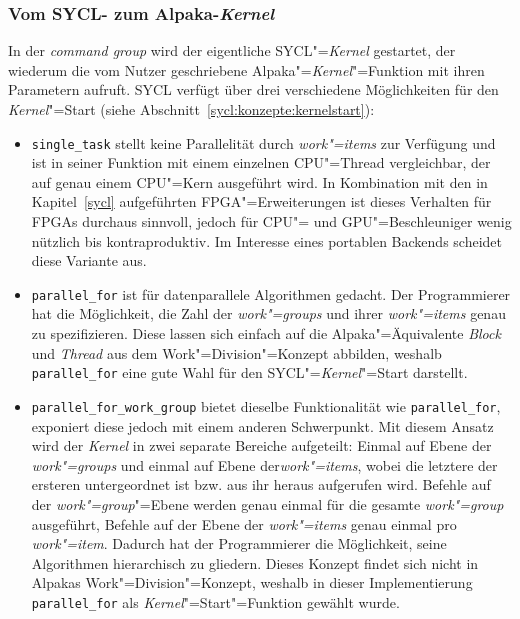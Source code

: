 \subsubsection{Vom SYCL- zum Alpaka-\textit{Kernel}}
\label{implementierung:task:kernel:launch}

In der \textit{command group} wird der eigentliche SYCL"=\textit{Kernel}
gestartet, der wiederum die vom Nutzer geschriebene
Alpaka"=\textit{Kernel}"=Funktion mit ihren Parametern aufruft. SYCL verfügt
über drei verschiedene Möglichkeiten für den \textit{Kernel}"=Start (siehe
Abschnitt~\ref{sycl:konzepte:kernelstart}):

\begin{itemize}
    \item \texttt{single\_task} stellt keine Parallelität durch
          \textit{work"=items} zur Verfügung und ist in seiner Funktion mit
          einem einzelnen CPU"=Thread vergleichbar, der auf genau einem
          CPU"=Kern ausgeführt wird. In Kombination mit den in
          Kapitel~\ref{sycl} aufgeführten FPGA"=Erweiterungen ist dieses
          Verhalten für FPGAs durchaus sinnvoll, jedoch für CPU"= und
          GPU"=Beschleuniger wenig nützlich bis kontraproduktiv. Im Interesse
          eines portablen Backends scheidet diese Variante aus.
    \item \texttt{parallel\_for} ist für datenparallele Algorithmen gedacht.
          Der Programmierer hat die Möglichkeit, die Zahl der
          \textit{work"=groups} und ihrer \textit{work"=items} genau zu
          spezifizieren. Diese lassen sich einfach auf die Alpaka"=Äquivalente
          \textit{Block} und \textit{Thread} aus dem Work"=Division"=Konzept
          abbilden, weshalb \texttt{parallel\_for} eine gute Wahl für den
          SYCL"=\textit{Kernel}"=Start darstellt.
    \item \texttt{parallel\_for\_work\_group} bietet dieselbe Funktionalität wie
          \texttt{parallel\_for}, exponiert diese jedoch mit einem anderen
          Schwerpunkt. Mit diesem Ansatz wird der \textit{Kernel} in zwei
          separate Bereiche aufgeteilt: Einmal auf Ebene der
          \textit{work"=groups} und einmal auf Ebene der\textit{work"=items},
          wobei die letztere der ersteren untergeordnet ist bzw. aus ihr heraus
          aufgerufen wird. Befehle auf der \textit{work"=group}"=Ebene werden
          genau einmal für die gesamte \textit{work"=group} ausgeführt, Befehle
          auf der Ebene der \textit{work"=items} genau einmal pro
          \textit{work"=item}. Dadurch hat der Programmierer die Möglichkeit,
          seine Algorithmen hierarchisch zu gliedern. Dieses Konzept findet sich
          nicht in Alpakas Work"=Division"=Konzept, weshalb in dieser
          Implementierung \texttt{parallel\_for} als
          \textit{Kernel}"=Start"=Funktion gewählt wurde.
\end{itemize}


